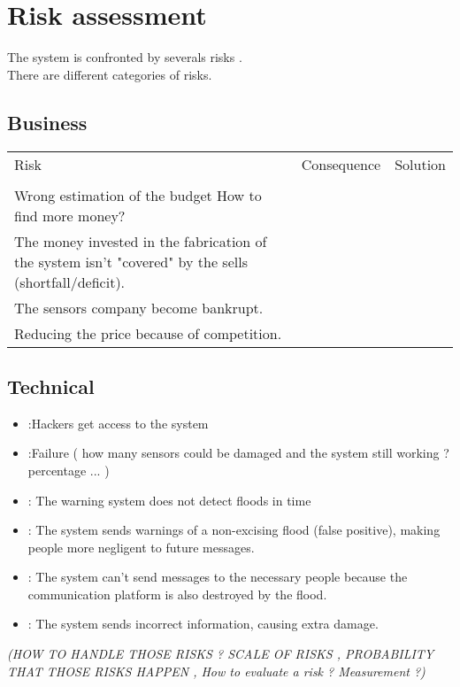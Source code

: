 \section{Risk assessment}


The system is confronted by severals risks .\\
There are different categories of risks.


\subsection{Business}

\begin{tabular} {l | c | r }

Risk & Consequence & Solution \\
\\
Wrong estimation of the budget How to find more money? & &  \\
The money invested in the fabrication of the system isn't "covered" by the sells (shortfall/deficit).& & \\
The sensors company become bankrupt. & &\\
Reducing the price because of competition. & & \\

\end{tabular}

\subsection{Technical}
\begin{itemize}
\item {}:Hackers get access to the system \\
\item {}:Failure ( how many sensors could be damaged and the system still working ? percentage ... ) \\ 

	\item {}: The warning system does not detect floods in time
	\item {}: The system sends warnings of a non-excising flood (false positive), making people more negligent to future messages.
	\item {}: The system can't send messages to the necessary people because the communication platform is also destroyed by the flood.
	\item {}: The system sends incorrect information, causing extra damage.
\end{itemize}


\textit{(HOW TO HANDLE THOSE RISKS ? SCALE OF RISKS , PROBABILITY THAT THOSE RISKS HAPPEN , How to evaluate a risk ? Measurement ?)}



